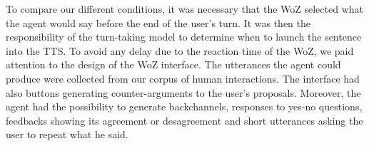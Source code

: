 To compare our different conditions, it was necessary that the WoZ selected what the agent would say before the end of the user's turn. It was then the responsibility of the turn-taking model to determine when to launch the sentence into the TTS. To avoid any delay due to the reaction time of the WoZ, we paid attention to the design of the WoZ interface.
The utterances the agent could produce were collected from our corpus of human interactions. 
The interface had also buttons generating counter-arguments to the user's proposals. %
Moreover, the agent had the possibility to generate backchannels, responses to yes-no questions, feedbacks showing its agreement or desagreement and short utterances asking the user to repeat what he said.

